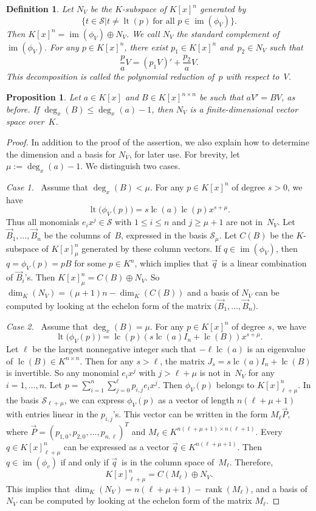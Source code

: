 \documentclass{sig-alternate}
\newtheorem{prop}[theorem]{Proposition}
\newtheorem{defi}[theorem]{Definition}
\newcommand{\cS}{ {\mathcal S}}
\def\lc{\operatorname{lc}}
\def\rank{\operatorname{rank}}
\def\lt{\operatorname{lt}}
\def\im{\operatorname{im}}
\begin{document}
\begin{defi}
Let $N_V$ be the $K$-subspace of $K[x]^n$ generated by
\[
  \bigl\{t \in \cS \mathrel{\big|} t \neq \lt(p) \ \text{for all $p\in \im(\phi_V)$}\bigr\}.
\]
Then $K[x]^n = \im(\phi_V) \oplus N_V$.
We call $N_V$ the \emph{standard complement} of $\im(\phi_V)$.
For any $p\in K[x]^n$, there exist $p_1\in K[x]^n$ and~$p_2\in N_V$ such that
\[\frac{p}{a}V = (p_1V)' + \frac{p_2}{a}V.\]
This decomposition is called the \emph{polynomial reduction} of~$p$
with respect to~$V$.
\end{defi}

\begin{prop}\label{PROP:finite}
Let $a\in K[x]$ and $B\in K[x]^{n \times n}$ be such that $aV'=BV$, as before.
If $\deg_x(B) \leq \deg_x(a)-1$, then $N_V$ is a finite-dimensional
vector space over~$K$.
\end{prop}
\begin{proof}
In addition to the proof of the assertion, we also explain how to determine
the dimension and a basis for $N_V$, for later use. For brevity, let
$\mu:=\deg_x(a)-1$. We distinguish two cases.

\smallskip
{\it Case 1.}~
Assume that $\deg_x(B) < \mu$. For any $p\in K[x]^n$ of degree $s>0$, we have
\[
  \lt\bigl(\phi_V(p)\bigr) = s\lc(a)\lc(p)x^{s+\mu}.
\]
Thus all monomials $e_i x^j\in \cS$ with $1\leq i\leq n$ and $j\geq \mu+1$ are not in~$N_V$.
Let $\vec{B}_1, \ldots, \vec{B}_n$ be the columns of~$B$, expressed in the basis $\cS_\mu$.
Let $C(B)$ be the $K$-subspace of $K[x]_\mu^n$ generated by these column vectors.
If $q\in \im(\phi_V)$, then $q = \phi_V(p) = pB$ for some $p \in K^n$, which implies that
$\vec{q}\,$ is a linear combination of $\vec{B}_i$'s. Then $K[x]_\mu^n = C(B) \oplus N_V$.
So $\dim_K(N_V)= (\mu+1)n - \dim_K(C(B))$ and a basis of $N_V$ can be computed by
looking at the echelon form of the matrix $\bigl(\vec{B}_1, \ldots, \vec{B}_n\bigr)$.

\smallskip
{\it Case 2.}~
Assume that $\deg_x(B) =\mu$. For any $p\in K[x]^n$ of degree $s$, we have
\[
  \lt\bigl(\phi_V(p)\bigr) = \lc(p)(s\lc(a)I_n + \lc(B))x^{s+\mu}.
\]
Let $\ell$ be the largest nonnegative integer such that $-\ell \lc(a)$ is an
eigenvalue of $\lc(B)\in K^{n\times n}$. Then for any $s>\ell$,
the matrix $J_s = s\lc(a)I_n + \lc(B)$ is invertible. So any monomial $e_ix^j$ with $j> \ell+\mu$ is not in~$N_V$
for any $i=1, \ldots, n$. Let $p = \sum_{i=1}^n \sum_{j=0}^{\ell} p_{i, j} e_ix^j$.
Then $\phi_V(p)$ belongs to $K[x]_{\ell+\mu}^n$.
In the basis $\cS_{\ell+\mu}$, we can
express $\phi_V(p)$ as a vector of length ${n(\ell+\mu+1)}$ with entries linear in the $p_{i, j}$'s.
This vector can be written in the form $M_{\ell} \vec{P}$,
where $\vec{P} = (p_{1, 0}, p_{2, 0}, \ldots, p_{n, \ell})^T$ and $M_{\ell} \in K^{n(\ell+\mu +1) \times n(\ell+1)}$.
Every $q\in K[x]_{\ell+\mu}^n$ can be expressed as a vector $\vec{q} \in K^{n(\ell + \mu +1)}$.
Then $q\in\im(\phi_v)$ if and only if $\vec{q}\,$ is in the column space of~$M_{\ell}$.
Therefore,
\[K[x]_{\ell+\mu}^n = C({M_{\ell}}) \oplus N_V. \]
This implies that $\dim_K(N_V) = n(\ell+\mu+1) - \rank({M_{\ell}})$, and
a basis of $N_V$ can be computed by
looking at the echelon form of the matrix ${M_{\ell}}$.
\end{proof}
\end{document}
